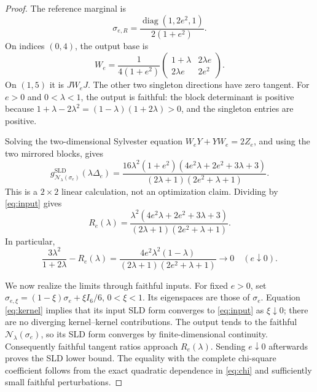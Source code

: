 \documentclass[11pt]{article}
\newcommand{\N}{\mathcal N}
\newcommand{\gmin}{g^{\mathrm{SLD}}}
\theoremstyle{remark}
\begin{document}
\begin{proof}
The reference marginal is
\[
 \sigma_{e,R}=\frac{\operatorname{diag}(1,2e^2,1)}{2(1+e^2)}.
\]
On indices \((0,4)\), the output base is
\begin{equation}\label{eq:block}
 W_e=\frac1{4(1+e^2)}
 \begin{pmatrix}1+\lambda&2\lambda e\\2\lambda e&2e^2\end{pmatrix}.
\end{equation}
On \((1,5)\) it is \(JW_eJ\).
The other two singleton directions have zero tangent.
For \(e>0\) and \(0<\lambda<1\), the output is faithful:
the block determinant is positive because
\(1+\lambda-2\lambda^2=(1-\lambda)(1+2\lambda)>0\),
and the singleton entries are positive.

Solving the two-dimensional Sylvester equation
\(W_eY+YW_e=2Z_e\), and using the two mirrored blocks, gives
\begin{equation}\label{eq:output}
 \gmin_{\N_\lambda(\sigma_e)}(\lambda\Delta_e)
 =
 \frac{16\lambda^2(1+e^2)
 (4e^2\lambda+2e^2+3\lambda+3)}
 {(2\lambda+1)(2e^2+\lambda+1)}.
\end{equation}
This is a \(2\times2\) linear calculation, not an optimization claim.
Dividing by \eqref{eq:input} gives
\begin{equation}\label{eq:ratio}
 R_e(\lambda)=
 \frac{\lambda^2(4e^2\lambda+2e^2+3\lambda+3)}
 {(2\lambda+1)(2e^2+\lambda+1)}.
\end{equation}
In particular,
\begin{equation}\label{eq:gap}
 \frac{3\lambda^2}{1+2\lambda}-R_e(\lambda)
 =
 \frac{4e^2\lambda^2(1-\lambda)}
 {(2\lambda+1)(2e^2+\lambda+1)}
 \longrightarrow0 \quad(e\downarrow0).
\end{equation}

We now realize the limits through faithful inputs. For fixed \(e>0\), set
\(\sigma_{e,\xi}=(1-\xi)\sigma_e+\xi I_6/6\), \(0<\xi<1\).
Its eigenspaces are those of \(\sigma_e\).
Equation \eqref{eq:kernel} implies that its input SLD form converges to
\eqref{eq:input} as \(\xi\downarrow0\); there are no diverging kernel--kernel contributions.
The output tends to the faithful \(\N_\lambda(\sigma_e)\), so its SLD form converges by finite-dimensional continuity.
Consequently faithful tangent ratios approach \(R_e(\lambda)\).
Sending \(e\downarrow0\) afterwards proves the SLD lower bound.
The equality with the complete chi-square coefficient follows from the exact quadratic dependence in \eqref{eq:chi} and sufficiently small faithful perturbations.


\end{proof}
\end{document}
